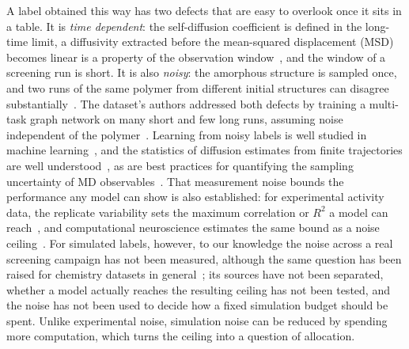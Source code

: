 \documentclass[journal=jcisd8,manuscript=article,email=true]{achemso}
\begin{document}
A label obtained this way has two defects that are easy to overlook once it sits in a table.
It is \emph{time dependent}: the self-diffusion coefficient is defined in the long-time limit, a
diffusivity extracted before the mean-squared displacement (MSD) becomes linear is a property of
the observation window~\cite{Maginn2018BestPractices}, and the window of a screening run is short.
It is also \emph{noisy}: the amorphous structure is sampled once, and two runs of the same polymer
from different initial structures can disagree substantially~\cite{Xie2022Accelerating}. The
dataset's authors addressed both defects by training a multi-task graph network on many short and
few long runs, assuming noise independent of the polymer~\cite{Xie2022Accelerating}. Learning from
noisy labels is well studied in machine learning~\cite{Frenay2014LabelNoise}, and the statistics
of diffusion estimates from finite trajectories are well
understood~\cite{He2018Variances,Bullerjahn2020Optimal,McCluskey2025Accurate,McCluskey2024kinisi},
as are best practices for quantifying the sampling uncertainty of MD
observables~\cite{Grossfield2018BestPractices}. That measurement
noise bounds the performance any model can show is also established: for experimental activity
data, the replicate variability sets the maximum correlation or $R^2$ a model can
reach~\cite{Brown2009Skepticism,Kramer2012Ki}, and computational neuroscience estimates the same
bound as a noise ceiling~\cite{LageCastellanos2019NoiseCeiling}. For simulated labels, however,
to our knowledge the noise across a real screening campaign has not been measured, although the
same question has been raised for chemistry datasets in general~\cite{Crusius2025FittingNoise}; its
sources have not been separated,
whether a model actually reaches the resulting ceiling has not been tested, and the noise has not
been used to decide how a fixed simulation budget should be spent. Unlike experimental noise,
simulation noise can be reduced by spending more computation, which turns the ceiling into a
question of allocation.
\end{document}
